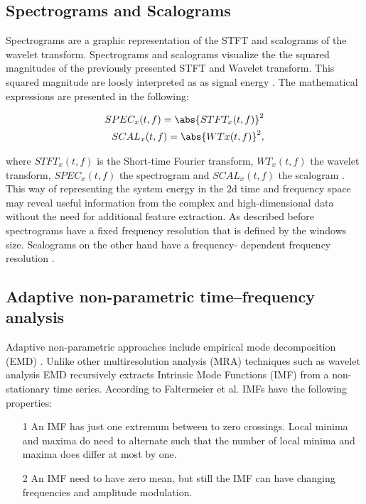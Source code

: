 \subsection{Spectrograms and Scalograms}

 Spectrograms are a graphic representation of the STFT and scalograms of the wavelet transform. Spectrograms and scalograms visualize the the squared magnitudes of the previously presented STFT and Wavelet transform. This squared magnitude are loosly interpreted as as signal energy \cite{Hlawatsch1992}. The mathematical expressions are presented in the following: 

\begin{equation}
    \begin{aligned}
        SPEC_{x}(t,f) = \abs{STFT_{x}(t,f)}^{2} \\
        SCAL_{x}(t,f) = \abs{WT{x}(t,f)}^{2}, 
    \end{aligned}
\end{equation}

where $STFT_{x}(t,f)$ is the Short-time Fourier transform, $WT_{x}(t,f)$ the wavelet transform, $SPEC_{x}(t,f)$ the spectrogram and $SCAL_{x}(t,f)$ the scalogram \cite{Hlawatsch1992}. This way of representing the system energy in the 2d time and frequency space may reveal useful information from the complex and high-dimensional data without the need for additional feature extraction. As described before spectrograms have a fixed frequency resolution that is defined by the windows size. Scalograms on the other hand have a frequency- dependent frequency resolution \cite{Verstraete2017}.

\subsection{Adaptive non-parametric time–frequency analysis}
Adaptive non-parametric approaches include empirical mode decomposition (EMD) \cite{FENG2013}. Unlike other multiresolution analysis (MRA) techniques such as wavelet analysis EMD recursively extracts Intrinsic Mode Functions (IMF) from a non-stationary time series. According to Faltermeier et al. \cite{Faltermeier2010} IMFs have the following properties: 

\begin{itemize}
    \item [1] An IMF has just one extremum between to zero crossings. Local minima and maxima do need to alternate such that the number of local minima and maxima does differ at most by one. 
    \item[2] An IMF need to have zero mean, but still the IMF can have changing frequencies and amplitude modulation. 
\end{itemize}

